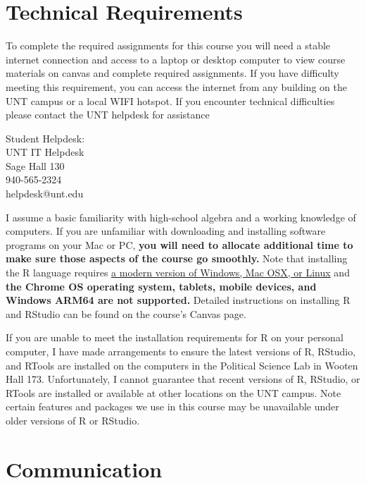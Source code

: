 \documentclass[12pt,]{article}
\begin{document}
\hypertarget{technical-requirements}{%
\section{Technical Requirements}\label{technical-requirements}}

\noindent To complete the required assignments for this course you will
need a stable internet connection and access to a laptop or desktop
computer to view course materials on canvas and complete required
assignments. If you have difficulty meeting this requirement, you can
access the internet from any building on the UNT campus or a local WIFI
hotspot. If you encounter technical difficulties please contact the UNT
helpdesk for assistance

\begin{raggedright}
Student Helpdesk:\\
UNT IT Helpdesk\\
Sage Hall 130\\
940-565-2324\\
helpdesk@unt.edu
\end{raggedright}

I assume a basic familiarity with high-school algebra and a working
knowledge of computers. If you are unfamiliar with downloading and
installing software programs on your Mac or PC, \textbf{you will need to
allocate additional time to make sure those aspects of the course go
smoothly.} Note that installing the R language requires
\href{https://cran.r-project.org/doc/FAQ/R-FAQ.html\#What-machines-does-R-run-on_003f}{a
modern version of Windows, Mac OSX, or Linux} and \textbf{the Chrome OS
operating system, tablets, mobile devices, and Windows ARM64 are not
supported.} Detailed instructions on installing R and RStudio can be
found on the course's Canvas page.

If you are unable to meet the installation requirements for R on your
personal computer, I have made arrangements to ensure the latest
versions of R, RStudio, and RTools are installed on the computers in the
Political Science Lab in Wooten Hall 173. Unfortunately, I cannot
guarantee that recent versions of R, RStudio, or RTools are installed or
available at other locations on the UNT campus. Note certain features
and packages we use in this course may be unavailable under older
versions of R or RStudio.

\hypertarget{communication}{%
\section{Communication}\label{communication}}
\end{document}
